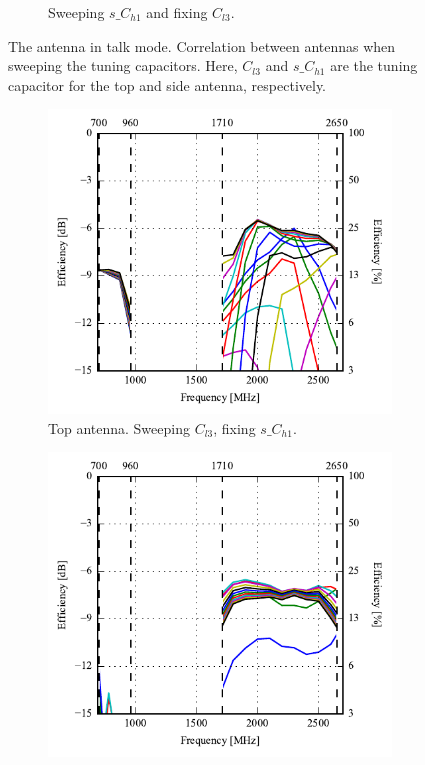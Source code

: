 \begin{figure}[htbp]
\begin{subfigure}{0.49\linewidth}
        \caption{Sweeping $s\_C_{h1}$ and fixing $C_{l3}$.}
    \end{subfigure}
    \caption{The antenna in talk mode. Correlation between antennas when sweeping the tuning capacitors. Here, $C_{l3}$ and $s\_C_{h1}$ are the tuning capacitor for the top and side antenna, respectively.}
    \label{fig:corr_sol3_talk}
\end{figure}

\begin{figure}[htbp]
    \centering
    \begin{subfigure}{0.49\linewidth}
        \centering
        \includegraphics{img/tech_sol/nonresonant/simulation/talk_mode/EffSweepAC1/efficiency-ac1-top}
        \caption{Top antenna. Sweeping $C_{l3}$, fixing $s\_C_{h1}$.}
    \end{subfigure}
    \hfill
    \begin{subfigure}{0.49\linewidth}
        \centering
        \includegraphics{img/tech_sol/nonresonant/simulation/talk_mode/EffSweepAC2/efficiency-ac2-side}

\end{subfigure}
\end{figure}
